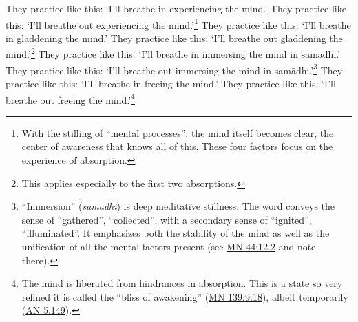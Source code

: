 \documentclass[12pt,openany]{book}%
\begin{document}
They practice like this: ‘I’ll breathe in experiencing the mind.’ They practice like this: ‘I’ll breathe out experiencing the mind.’\footnote{With the stilling of “mental processes”, the mind itself becomes clear, the center of awareness that knows all of this. These four factors focus on the experience of absorption. } They practice like this: ‘I’ll breathe in gladdening the mind.’ They practice like this: ‘I’ll breathe out gladdening the mind.’\footnote{This applies especially to the first two absorptions. } They practice like this: ‘I’ll breathe in immersing the mind in \textsanskrit{samādhi}.’ They practice like this: ‘I’ll breathe out immersing the mind in \textsanskrit{samādhi}.’\footnote{“Immersion” (\textit{\textsanskrit{samādhi}}) is deep meditative stillness. The word conveys the sense of “gathered”, “collected”, with a secondary sense of “ignited”, “illuminated”. It emphasizes both the stability of the mind as well as the unification of all the mental factors present (see \href{https://suttacentral.net/mn44/en/sujato\#12.2}{MN 44:12.2} and note there). } They practice like this: ‘I’ll breathe in freeing the mind.’ They practice like this: ‘I’ll breathe out freeing the mind.’\footnote{The mind is liberated from hindrances in absorption. This is a state so very refined it is called the “bliss of awakening” (\href{https://suttacentral.net/mn139/en/sujato\#9.18}{MN 139:9.18}), albeit temporarily (\href{https://suttacentral.net/an5.149/en/sujato}{AN 5.149}). } 
\end{document}
